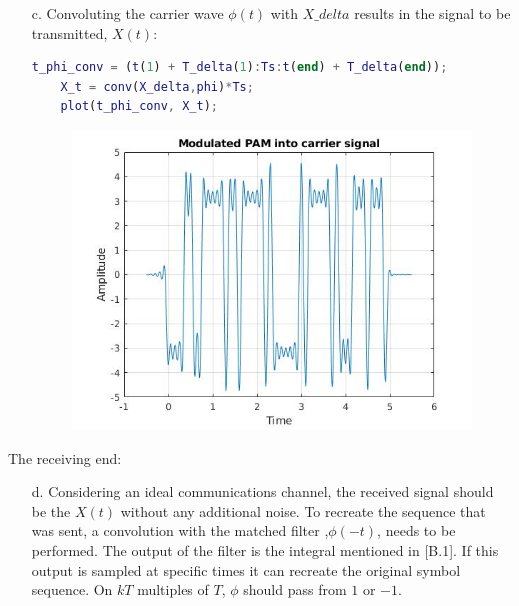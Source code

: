 \documentclass[12pt, a4paper]{article}
\begin{document}
\begin{enumerate}
\begin{enumerate}
\pagebreak
\item[c.] Convoluting the carrier wave $\phi(t)$ with $X\_delta$ results in the signal to be transmitted, $X(t)$:
\begin{lstlisting}[language=MATLAB]
    t_phi_conv = (t(1) + T_delta(1):Ts:t(end) + T_delta(end));
    X_t = conv(X_delta,phi)*Ts;
    plot(t_phi_conv, X_t);
\end{lstlisting}

\begin{figure}[H]
\centering
\noindent\includegraphics[width=\textwidth]{delta_pam_mod.jpg}
\end{figure}



\pagebreak
\end{enumerate}
The receiving end:
\begin{enumerate}
\item[d.] Considering an ideal communications channel, the received signal should be the $X(t)$ without any additional noise. To recreate the sequence that was sent, a convolution with the matched filter ,$\phi(-t)$, needs to be performed. The output of the filter is the integral mentioned in [B.1]. If this output is sampled at specific times it can recreate the original symbol sequence. On $kT$ multiples of $T$, $\phi$ should pass from $1$ or $-1$.
\end{enumerate}


\end{enumerate}
\end{document}
